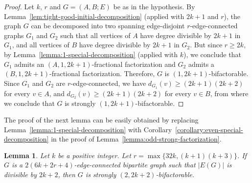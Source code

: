 \documentclass[12pt,reqno,a4paper]{amsart}
\newtheorem{lemma}[theorem]{Lemma}
\begin{document}
\begin{proof}
	Let $k$, $r$ and $G=(A,B;E)$ be as in the hypothesis.
	By Lemma~\ref{lem:tight-good-initial-decomposition} (applied with 
\(2k+1\) and $r$), the graph \(G\) can be decomposed into two spanning edge-disjoint 
\(r\)-edge-connected 
	graphs \(G_1\) and \(G_2\) such that all vertices of \(A\) have degree 
divisible by \(2k+1\)
	in \(G_1\), and all vertices of \(B\) have degree divisible by 
\(2k+1\) 
in \(G_2\).  But since $r\geq 2k$, by Lemma~\ref{lemma:1-special-decomposition} (applied with \(k\)), 
	we conclude that \(G_1\) admits 
	an \((A,1,2k+1)\)-fractional factorization
	and \(G_2\) admits a \((B,1,2k+1)\)-fractional factorization.
	Therefore, \(G\) is \((1,2k+1)\)-bifactorable.
%	
	Since \(G_1\) and \(G_2\) are \(r\)-edge-connected,
	we have \(d_{G_1}(v) \geq (2k+1)(2k+2)\) for every \(v\in A\),
	and \(d_{G_2}(v) \geq (2k+1)(2k+2)\) for every \(v\in B\), from 
where we conclude that \(G\) is strongly 
\((1,2k+1)\)-bifactorable.
\end{proof}

The proof of the next lemma can be easily obtained by replacing Lemma~\ref{lemma:1-special-decomposition} with
Corollary~\ref{corollary:even-special-decomposition} in the proof of Lemma~\ref{lemma:odd-strong-factorization}.

\begin{lemma}\label{lemma:even-strong-factorization}
	Let \(k\) be a positive integer.
	Let \(r = \max\{32k,(k+1)(k+3)\}\).
	If \(G\) is a  \(2(6k + 2r + 4)\)-edge-connected bipartite graph
	 such that \(|E(G)|\) is divisible by \(2k+2\),
	then \(G\) is strongly \((2,2k+2)\)-bifactorable.
\end{lemma}

	
\end{document}
